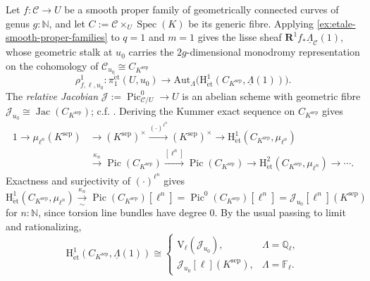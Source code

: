 \documentclass[11pt,letterpaper]{article}
\theoremstyle{numberfirstplain}
\numberwithin{equation}{theorem}
\theoremstyle{numberfirstupright}
\begin{document}
Let $f:\mathcal C\to U$ be a smooth proper family of geometrically connected curves of genus $g:\mathbb N$, and let $C:=\mathcal C\times_U\operatorname{Spec}(K)$ be its generic fibre.
Applying \cref{ex:etale-smooth-proper-families} to $q=1$ and $m=1$ gives the lisse sheaf $\mathbf R^1f_*\underline{\Lambda}_{\mathcal C}(1)$, whose geometric stalk at $u_0$ carries the $2g$-dimensional monodromy representation on the cohomology of $\mathcal C_{u_0}\cong C_{K^{\mathrm{sep}}}$
\[
\rho^1_{f,\ell,u_0}:\pi_1^{\mathrm{\acute{e}t}}(U,u_0)
\longrightarrow\mathrm{Aut}_{\Lambda}\bigl(\mathrm H^1_{\mathrm{\acute{e}t}}(C_{K^{\mathrm{sep}}},\underline{\Lambda}(1))\bigr).
\]
The \textit{relative Jacobian} $\mathcal J:=\operatorname{Pic}^0_{\mathcal C/U}\to U$ is an abelian scheme with geometric fibre $\mathcal J_{u_0}\cong\operatorname{Jac}(C_{K^{\mathrm{sep}}})$; c.f. \cite[Chapter~III, \S8]{Milne2008AbelianVarieties}. 
Deriving the Kummer exact sequence on $C_{K^{\mathrm{sep}}}$ gives
\[
\begin{aligned}
1\longrightarrow\mu_{\ell^n}(K^{\mathrm{sep}})
&\longrightarrow(K^{\mathrm{sep}})^\times
\xrightarrow{(\cdot)^{\ell^n}}(K^{\mathrm{sep}})^\times
\longrightarrow\mathrm H^1_{\mathrm{\acute{e}t}}(C_{K^{\mathrm{sep}}},\mu_{\ell^n})\\
&\xrightarrow{\kappa_n}\operatorname{Pic}(C_{K^{\mathrm{sep}}})
\xrightarrow{[\ell^n]}\operatorname{Pic}(C_{K^{\mathrm{sep}}})
\longrightarrow\mathrm H^2_{\mathrm{\acute{e}t}}(C_{K^{\mathrm{sep}}},\mu_{\ell^n})
\longrightarrow\cdots.
\end{aligned}
\]
Exactness and surjectivity of $(\cdot)^{\ell^n}$ gives
\[
\mathrm H^1_{\mathrm{\acute{e}t}}(C_{K^{\mathrm{sep}}},\mu_{\ell^n})
\xrightarrow[\sim]{\kappa_n}\operatorname{Pic}(C_{K^{\mathrm{sep}}})[\ell^n]
=\operatorname{Pic}^0(C_{K^{\mathrm{sep}}})[\ell^n]
=\mathcal J_{u_0}[\ell^n](K^{\mathrm{sep}})
\]
for $n:\mathbb N$, since torsion line bundles have degree $0$.
By the usual passing to limit and rationalizing,
\[
\mathrm H^1_{\mathrm{\acute{e}t}}(C_{K^{\mathrm{sep}}},\underline{\Lambda}(1))
\cong\begin{cases}
\mathrm V_\ell(\mathcal J_{u_0}), & \Lambda=\mathbb Q_\ell,\\[3pt]
\mathcal J_{u_0}[\ell](K^{\mathrm{sep}}), & \Lambda=\mathbb F_\ell.
\end{cases}
\]
\end{document}
